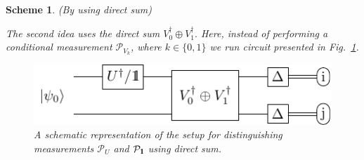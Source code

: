 \documentclass[preprint,12pt, a4paper, dvipsnames]{elsarticle}
\newcommand{\ket}[1]{\ensuremath{|#1\rangle}}
\newcommand{\bra}[1]{\ensuremath{\langle#1|}}
\newcommand{\ketbra}[2]{\ensuremath{\ket{#1}\bra{#2}}}
\newcommand{\proj}[1]{\ensuremath{\ketbra{#1}{#1}}}
\newcommand{\1}{{\rm 1\hspace{-0.9mm}l}}
\newcommand{\Id}{{\rm 1\hspace{-0.9mm}l}}
\newcommand{\PP}{\mathcal{P}}
\newtheorem{scheme}{Scheme}
\begin{document}
\begin{scheme}(By using direct sum)


The second idea uses  the direct sum $V_0^\dagger \oplus V_1^\dagger.$    Here, instead of performing a conditional
measurement $\PP_{V_k}$, where $k\in \{0,1\}$ we run circuit presented in	Fig.~\ref{fig:controlled}.

	\begin{figure}[h!]
		\centering
		\includegraphics[scale=1.5]{pics/controlled_unitary}

		\caption{ A schematic representation of the setup for distinguishing
			measurements $\PP_{U}$ and $\PP_{\Id}$ using direct sum.
		}\label{fig:controlled}
	\end{figure}


\end{scheme}
\end{document}
